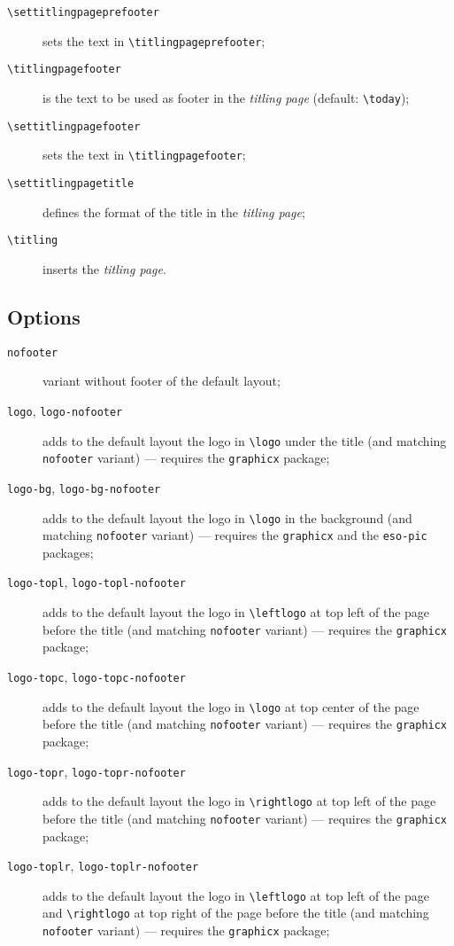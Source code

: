 \documentclass[a4paper,oneside,centered,noparindent,noparskip]{bookest}
\begin{document}
\begin{description}
 \item[\texttt{\textbackslash settitlingpageprefooter}] sets the text in \texttt{\textbackslash titlingpageprefooter};
 \item[\texttt{\textbackslash titlingpagefooter}] is the text to be used as footer in the \emph{titling page} (default: \texttt{\textbackslash today});
 \item[\texttt{\textbackslash settitlingpagefooter}] sets the text in \texttt{\textbackslash titlingpagefooter};
 \item[\texttt{\textbackslash settitlingpagetitle}] defines the format of the title in the \emph{titling page};
 \item[\texttt{\textbackslash titling}] inserts the \emph{titling page}.
\end{description}

\subsection{Options}\label{copertinaopzioni}
\begin{description}
 \item[\texttt{nofooter}] variant without footer of the default layout;
 \item[\texttt{logo}, \texttt{logo-nofooter}] adds to the default layout the logo in \texttt{\textbackslash logo} under the title (and matching \texttt{nofooter} variant) --- requires the \texttt{graphicx} package;
 \item[\texttt{logo-bg}, \texttt{logo-bg-nofooter}] adds to the default layout the logo in \texttt{\textbackslash logo} in the background (and matching \texttt{nofooter} variant) --- requires the \texttt{graphicx} and the \texttt{eso-pic} packages;
 \item[\texttt{logo-topl}, \texttt{logo-topl-nofooter}] adds to the default layout the logo in \texttt{\textbackslash leftlogo} at top left of the page before the title (and matching \texttt{nofooter} variant) --- requires the \texttt{graphicx} package;
 \item[\texttt{logo-topc}, \texttt{logo-topc-nofooter}] adds to the default layout the logo in \texttt{\textbackslash logo} at top center of the page before the title (and matching \texttt{nofooter} variant) --- requires the \texttt{graphicx} package;
 \item[\texttt{logo-topr}, \texttt{logo-topr-nofooter}]  adds to the default layout the logo in \texttt{\textbackslash rightlogo} at top left of the page before the title (and matching \texttt{nofooter} variant) --- requires the \texttt{graphicx} package;
 \item[\texttt{logo-toplr}, \texttt{logo-toplr-nofooter}]  adds to the default layout the logo in \texttt{\textbackslash leftlogo} at top left of the page and \texttt{\textbackslash rightlogo} at top right of the page before the title (and matching \texttt{nofooter} variant) --- requires the \texttt{graphicx} package;
\end{description}
\end{document}
